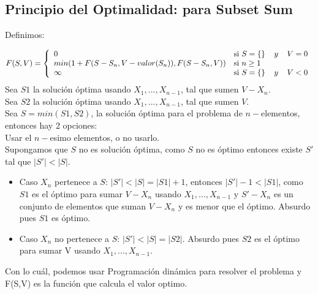 \subsection{Principio del Optimalidad: para Subset Sum}
Definimos:

 \begin{equation}
     \label{eq:F-recursiva}
     F(S,V) = \left\{
	       \begin{array}{ll}
		 0      & \mathrm{si\ }  S = \{\} \hspace{4mm} y\hspace{4mm} V = 0\\
		 min(1+F(S-S_{n},V-valor(S_{n})),F(S-S_{n},V)) & \mathrm{si\ } n \geq 1 \\
		 \infty     & \mathrm{si\ } S = \{\} \hspace{4mm} y \hspace{4mm} V < 0
	       \end{array}
	     \right.
   \end{equation}
Sea $S1$ la solución óptima usando $X_{1},...,X_{n-1}$, tal que sumen $V-X_{n}$.\\
Sea $S2$ la solución óptima usando $X_{1},...,X_{n-1}$, tal que sumen $V$.\\
Sea $S = min(S1, S2)$, la solución óptima para el problema de $n-$elementos, entonces hay 2 opciones:\\
Usar el $n-$esimo elementos, o no usarlo.\\
Supongamos que $S$ no es solución óptima, como $S$ no es óptimo entonces existe $S'$ tal que $|S'|<|S|$.\\
\begin{itemize}
    \item Caso $X_{n}$ pertenece a $S$: $|S'| < |S| = |S1|+1$, entonces $|S'|-1 < |S1|$, como $S1$ es el óptimo para sumar $V-X_{n}$ usando $X_{1},...,X_{n-1}$ y $S'-X_{n}$ es un conjunto de elementos que suman $V-X_{n}$ y es menor que el óptimo. Absurdo pues $S1$ es óptimo.
    \item Caso $X_{n}$ no pertenece a $S$: $|S'| < |S| = |S2|$. Absurdo pues $S2$ es el óptimo para sumar V usando $X_{1},...,X_{n-1}.$ 
\end{itemize}
Con lo cuál, podemos usar Programaci\'on din\'amica para resolver el problema y F(S,V) es la funci\'on que calcula el valor optimo.

